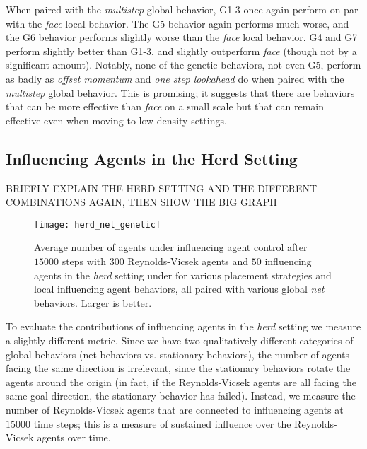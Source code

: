 When paired with the \textit{multistep} global behavior, G1-3 once again
perform on par with the \textit{face} local behavior.
The G5 behavior again performs much worse, and the G6 behavior performs slightly
worse than the \textit{face} local behavior.
G4 and G7 perform slightly better than G1-3, and slightly outperform \textit{face}
(though not by a significant amount).
Notably, none of the genetic behaviors, not even G5, perform as badly as \textit{
offset momentum} and \textit{one step lookahead} do when paired with the
\textit{multistep} global behavior.
This is promising; it suggests that there are behaviors that can be more effective
than \textit{face} on a small scale but that can remain effective even when moving
to low-density settings.

\subsection{Influencing Agents in the Herd Setting}
BRIEFLY EXPLAIN THE HERD SETTING AND THE DIFFERENT COMBINATIONS AGAIN, THEN SHOW THE BIG GRAPH

\begin{figure}
    \centering
    \texttt{[image: herd\_net\_genetic]}
    \caption{Average number of agents under influencing agent control after $15000$
    steps with $300$ Reynolds-Vicsek agents and $50$ influencing agents in the
    \textit{herd} setting under for various placement strategies
    and local influencing agent behaviors, all paired with various global
    \textit{net} behaviors.
    Larger is better.}
    \label{fig:herd_net}
\end{figure}

To evaluate the contributions of influencing agents in the \textit{herd} setting
we measure a slightly different metric.
Since we have two qualitatively different categories of global behaviors (net
behaviors vs. stationary behaviors), the number of agents facing the same
direction is irrelevant, since the stationary behaviors rotate the agents around
the origin (in fact, if the Reynolds-Vicsek agents are all facing the same
goal direction, the stationary behavior has failed).
Instead, we measure the number of Reynolds-Vicsek agents that are connected to
influencing agents at $15000$ time steps; this is a measure of sustained
influence over the Reynolds-Vicsek agents over time.

